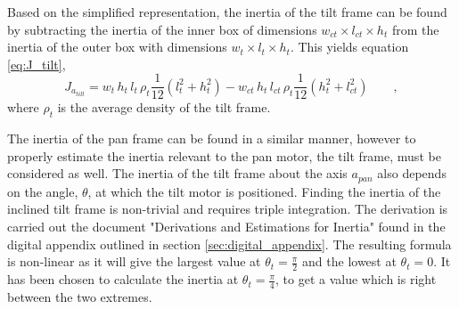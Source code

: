 \documentclass[../../main.tex]{subfiles}
\begin{document}

Based on the simplified representation, the inertia of the tilt frame can be found by subtracting the inertia of the inner box of dimensions $w_{ct}\times l_{ct}\times h_t$ from the inertia of the outer box with dimensions $w_t\times l_t\times h_t$. This yields equation \ref{eq:J_tilt},
\begin{equation} \label{eq:J_tilt}
    J_{a_{tilt}} =  w_{t} \,h_{t}\, l_{t}\,\rho_{t}\frac{1}{12}(l_{t}^2+h_{t}^2)-w_{ct}\, h_{t} \, l_{ct} \, \rho_{t}\frac{1}{12}(h_{t}^2+l_{ct}^2) \qquad ,
\end{equation}
where $\rho_t$ is the average density of the tilt frame.

The inertia of the pan frame can be found in a similar manner, however to properly estimate the inertia relevant to the pan motor, the tilt frame, must be considered as well. The inertia of the tilt frame about the axis $a_{pan}$ also depends on the angle, $\theta$, at which the tilt motor is positioned. Finding the inertia of the inclined tilt frame is non-trivial and requires triple integration. The derivation is carried out the document "Derivations and Estimations for Inertia" found in the digital appendix outlined in section \ref{sec:digital_appendix}. The resulting formula is non-linear as it will give the largest value at $\theta_{t}=\frac{\pi}{2}$ and the lowest at $\theta_t=0$. It has been chosen to calculate the inertia at $\theta_t = \frac{\pi}{4}$, to get a value which is right between the two extremes. 
\end{document}
